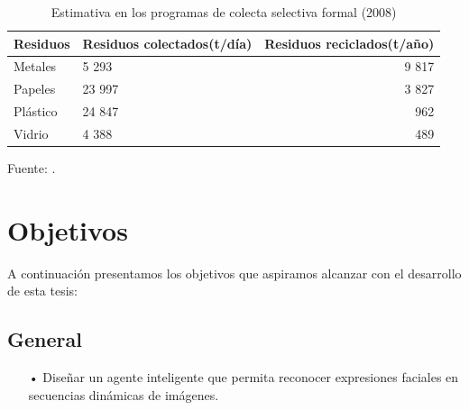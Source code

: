 \begin{center}
\begin{table}[ht!]
\centering
\caption{Estimativa en los programas de colecta selectiva formal (2008)}
\begin{tabular}{llr} \toprule
Residuos & Residuos colectados(t/día) & Residuos reciclados(t/año) \\ \midrule
Metales & 5 293 & 9 817 \\
Papeles & 23 997 & 3 827 \\
Plástico & 24 847 & 962 \\
Vidrio & 4 388 & 489 \\ \bottomrule
\end{tabular}
\vskip 0.2cm
\begin{center}
{\small{Fuente: \cite{MMA}.}}
\end{center}
\end{table}
\end{center}
\vskip 0.5cm



\section{Objetivos}
A continuación presentamos los objetivos que aspiramos alcanzar con el desarrollo de esta tesis:

\subsection{General}
\begin{enumerate}
\item[•] Diseñar un agente inteligente que permita reconocer expresiones faciales en secuencias dinámicas de imágenes.
\end{enumerate}
\vskip 0.3cm


